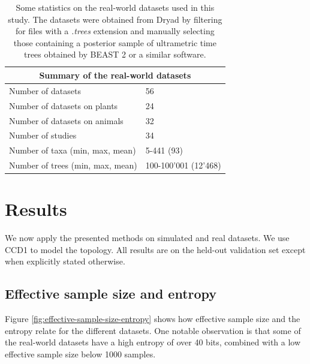 \documentclass[10pt,letterpaper]{article}
\begin{document}
\begin{table}[H]
	\caption{Some statistics on the real-world datasets used in this study. The datasets were obtained from Dryad \cite{dryad} by filtering for files with a \emph{.trees} extension and manually selecting those containing a posterior sample of ultrametric time trees obtained by BEAST 2 or a similar software.}
	\label{table-bio-datasets}

	\centering
	\begin{tabular}{@{}ll@{}}
		\toprule
		\multicolumn{2}{c}{Summary of the real-world datasets} \\
		\midrule
		Number of datasets	& 56 \\
		Number of datasets on plants & 24 \\
		Number of datasets on animals & 32 \\
		Number of studies	& 34 \\
		Number of taxa (min, max, mean) & 5-441 (93) \\
		Number of trees (min, max, mean) & 100-100'001 (12'468) \\
		\bottomrule
	\end{tabular}
\end{table}

\section*{Results}

We now apply the presented methods on simulated and real datasets. We use CCD1 to model the topology. All results are on the held-out validation set except when explicitly stated otherwise.

\subsection*{Effective sample size and entropy}

Figure \ref{fig:effective-sample-size-entropy} shows how effective sample size and the entropy relate for the different datasets. One notable observation is that some of the real-world datasets have a high entropy of over 40 bits, combined with a low effective sample size below 1000 samples.
\end{document}
